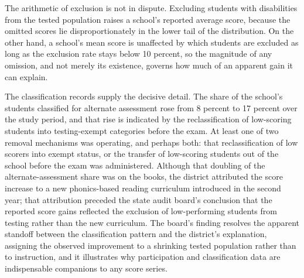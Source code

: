\documentclass[11pt]{article}
\begin{document}
{The arithmetic of exclusion is not in dispute. Excluding students with disabilities from the tested population raises a school's reported average score, because the omitted scores lie disproportionately in the lower tail of the distribution. On the other hand, a school's mean score is unaffected by which students are excluded as long as the exclusion rate stays below 10 percent, so the magnitude of any omission, and not merely its existence, governs how much of an apparent gain it can explain.

The classification records supply the decisive detail. The share of the school's students classified for alternate assessment rose from 8 percent to 17 percent over the study period, and that rise is indicated by the reclassification of low-scoring students into testing-exempt categories before the exam. At least one of two removal mechanisms was operating, and perhaps both: that reclassification of low scorers into exempt status, or the transfer of low-scoring students out of the school before the exam was administered. Although that doubling of the alternate-assessment share was on the books, the district attributed the score increase to a new phonics-based reading curriculum introduced in the second year; that attribution preceded the state audit board's conclusion that the reported score gains reflected the exclusion of low-performing students from testing rather than the new curriculum. The board's finding resolves the apparent standoff between the classification pattern and the district's explanation, assigning the observed improvement to a shrinking tested population rather than to instruction, and it illustrates why participation and classification data are indispensable companions to any score series.}
\end{document}
